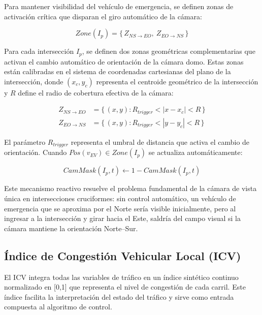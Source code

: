 \documentclass[12pt,a4paper,oneside]{report}
\begin{document}
Para mantener visibilidad del vehículo de emergencia, se definen zonas de activación crítica que disparan el giro automático de la cámara:

\begin{equation}
Zone(I_{p}) = \{\, Z_{NS \rightarrow EO},\ Z_{EO \rightarrow NS} \,\}
\end{equation}

Para cada intersección \(I_{p}\), se definen dos zonas geométricas complementarias que activan el cambio automático de orientación de la cámara domo. Estas zonas están calibradas en el sistema de coordenadas cartesianas del plano de la intersección, donde \((x_{c}, y_{c})\) representa el centroide geométrico de la intersección y \(R\) define el radio de cobertura efectiva de la cámara:

\begin{align}
Z_{NS \rightarrow EO} &= \{\,(x,y) : R_{trigger} < \left| x - x_{c} \right| < R \,\}\\
Z_{EO \rightarrow NS} &= \{\,(x,y) : R_{trigger} < \left| y - y_{c} \right| < R \,\}
\end{align}

El parámetro \(R_{trigger}\) representa el umbral de distancia que activa el cambio de orientación. Cuando \(Pos(v_{EV}) \in Zone(I_{p})\) se actualiza automáticamente:

\begin{equation}
CamMask(I_{p},t) \leftarrow 1 - CamMask(I_{p},t)
\end{equation}

Este mecanismo reactivo resuelve el problema fundamental de la cámara de vista única en intersecciones cruciformes: sin control automático, un vehículo de emergencia que se aproxima por el Norte sería visible inicialmente, pero al ingresar a la intersección y girar hacia el Este, saldría del campo visual si la cámara mantiene la orientación Norte--Sur.

\subsection{Índice de Congestión Vehicular Local (ICV)}\label{uxedndice-de-congestiuxf3n-vehicular-local-icv}

El ICV integra todas las variables de tráfico en un índice sintético continuo normalizado en {[}0,1{]} que representa el nivel de congestión de cada carril. Este índice facilita la interpretación del estado del tráfico y sirve como entrada compuesta al algoritmo de control.
\end{document}
